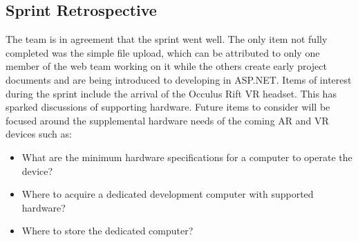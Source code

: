     \subsection{Sprint Retrospective}
    \label{sec:Sprint1_retrospective}
        \hspace{7mm}
        The team is in agreement that the sprint went well. The only item not fully completed was the simple
        file upload, which can be attributed to only one member of the web team working on it while the others
        create early project documents and are being introduced to developing in ASP.NET. Items of interest 
        during the sprint include the arrival of the Occulus Rift VR headset. This has sparked discussions of
        supporting hardware. Future items to consider will be focused around the supplemental hardware needs of the coming AR and VR devices such as:
        \begin{itemize}
            \item What are the minimum hardware specifications for a computer to operate the device?
            \item Where to acquire a dedicated development computer with supported hardware?
            \item Where to store the dedicated computer? 
        \end{itemize}

